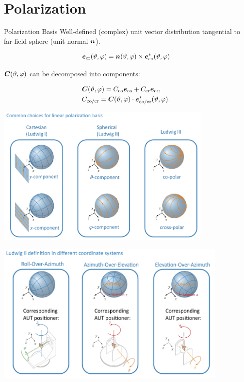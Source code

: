 \section{Polarization}

\begin{definition}{Polarization Basis}
  Well-defined (complex) unit vector distribution tangential to far-field sphere (unit normal $\boldsymbol{n}$).
\end{definition}

\begin{equation*}
  \boldsymbol{e}_{\text{cr}}(\vartheta,\varphi) = \boldsymbol{n}(\vartheta,\varphi) \times \boldsymbol{e}_{\text{co}}^{*}(\vartheta, \varphi)
\end{equation*}

$\boldsymbol{C}(\vartheta,\varphi)$ can be decomposed into components:

\begin{align*}
  &\boldsymbol{C}(\vartheta,\varphi) = C_{\text{co}}\boldsymbol{e}_{\text{co}} + C_{\text{cr}}\boldsymbol{e}_{\text{cr}},\\
  &C_{\text{co/cr}} = \boldsymbol{C}(\vartheta,\varphi) \cdot \boldsymbol{e}_{\text{co/cr}}^{*}(\vartheta,\varphi).
\end{align*}

\includegraphics[angle=90, height=7cm]{content/at_meas/pictures/linear_polarization_bases}

\includegraphics[angle=90, height=7cm]{content/at_meas/pictures/ludwig_II}

